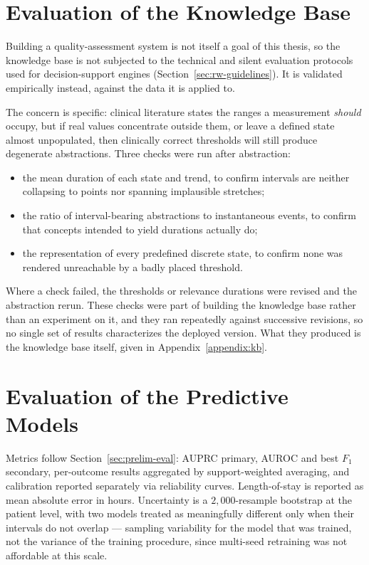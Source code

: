 \section{Evaluation of the Knowledge Base}
\label{sec:evalm-kb}
\label{sec:method-kb-eval}

Building a quality-assessment system is not itself a goal of this thesis, so the knowledge base is not subjected to the technical and silent evaluation protocols used for decision-support engines (Section~\ref{sec:rw-guidelines}). It is validated empirically instead, against the data it is applied to.

The concern is specific: clinical literature states the ranges a measurement \emph{should} occupy, but if real values concentrate outside them, or leave a defined state almost unpopulated, then clinically correct thresholds will still produce degenerate abstractions. Three checks were run after abstraction:

\begin{itemize}
\item the mean duration of each state and trend, to confirm intervals are neither collapsing to points nor spanning implausible stretches;
\item the ratio of interval-bearing abstractions to instantaneous events, to confirm that concepts intended to yield durations actually do;
\item the representation of every predefined discrete state, to confirm none was rendered unreachable by a badly placed threshold.
\end{itemize}

Where a check failed, the thresholds or relevance durations were revised and the abstraction rerun. These checks were part of building the knowledge base rather than an experiment on it, and they ran repeatedly against successive revisions, so no single set of results characterizes the deployed version. What they produced is the knowledge base itself, given in Appendix~\ref{appendix:kb}.

\section{Evaluation of the Predictive Models}
\label{sec:evalm-models}

Metrics follow Section~\ref{sec:prelim-eval}: AUPRC primary, AUROC and best $F_1$ secondary, per-outcome results aggregated by support-weighted averaging, and calibration reported separately via reliability curves. Length-of-stay is reported as mean absolute error in hours. Uncertainty is a $2{,}000$-resample bootstrap at the patient level, with two models treated as meaningfully different only when their intervals do not overlap --- sampling variability for the model that was trained, not the variance of the training procedure, since multi-seed retraining was not affordable at this scale.

